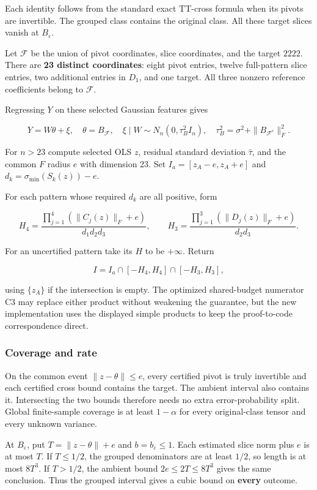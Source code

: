 \documentclass[
  11pt,
]{article}
\begin{document}
Each identity follows from the standard exact TT-cross formula when its
pivots are invertible. The grouped class contains the original class.
All these target slices vanish at \(B_\varepsilon\).

Let \(\mathcal F\) be the union of pivot coordinates, slice coordinates,
and the target \(2222\). There are \textbf{23 distinct coordinates}:
eight pivot entries, twelve full-pattern slice entries, two additional
entries in \(D_1\), and one target. All three nonzero reference
coefficients belong to \(\mathcal F\).

Regressing \(Y\) on these selected Gaussian features gives

\[Y=W\theta+\xi,\quad \theta=B_{\mathcal F},\quad
\xi\mid W\sim N_n(0,\tau_B^2I_n),\quad
\tau_B^2=\sigma^2+\|B_{\mathcal F^c}\|_F^2.\]

For \(n>23\) compute selected OLS \(z\), residual standard deviation
\(\widehat\tau\), and the common \(F\) radius \(e\) with dimension 23.
Set \(I_a=[z_A-e,z_A+e]\) and \(d_k=\sigma_{\min}(S_k(z))-e\).

For each pattern whose required \(d_k\) are all positive, form

\[H_4=\frac{\prod_{j=1}^4(\|C_j(z)\|_F+e)}{d_1d_2d_3},\qquad
H_3=\frac{\prod_{j=1}^3(\|D_j(z)\|_F+e)}{d_2d_3}.\]

For an uncertified pattern take its \(H\) to be \(+\infty\). Return

\[I=I_a\cap[-H_4,H_4]\cap[-H_3,H_3],\]

using \(\{z_A\}\) if the intersection is empty. The optimized
shared-budget numerator C3 may replace either product without weakening
the guarantee, but the new implementation uses the displayed simple
products to keep the proof-to-code correspondence direct.

\subsubsection{Coverage and rate}\label{coverage-and-rate}

On the common event \(\|z-\theta\|\le e\), every certified pivot is
truly invertible and each certified cross bound contains the target. The
ambient interval also contains it. Intersecting the two bounds therefore
needs no extra error-probability split. Global finite-sample coverage is
at least \(1-\alpha\) for every original-class tensor and every unknown
variance.

At \(B_\varepsilon\), put \(T=\|z-\theta\|+e\) and
\(b=b_\varepsilon\le1\). Each estimated slice norm plus \(e\) is at most
\(T\). If \(T\le1/2\), the grouped denominators are at least \(1/2\), so
length is at most \(8T^3\). If \(T>1/2\), the ambient bound
\(2e\le2T\le8T^3\) gives the same conclusion. Thus the grouped interval
gives a cubic bound on \textbf{every} outcome.
\end{document}

